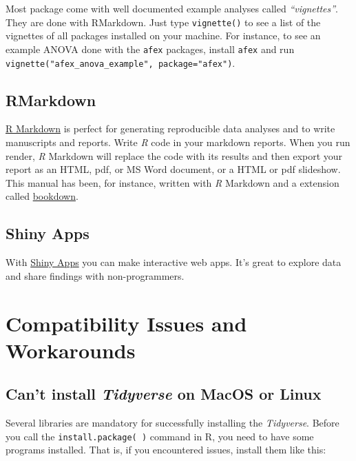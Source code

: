 \documentclass[
]{scrartcl}
\begin{document}
Most package come with well documented example analyses called \emph{``vignettes''}. They are done with RMarkdown. Just type \texttt{vignette()} to see a list of the vignettes of all packages installed on your machine. For instance, to see an example ANOVA done with the \texttt{afex} packages, install \texttt{afex} and run \texttt{vignette("afex\_anova\_example",\ package="afex")}.

\hypertarget{rmarkdown}{%
\subsection*{RMarkdown}\label{rmarkdown}}

\href{https://rmarkdown.rstudio.com/}{R Markdown} is perfect for generating reproducible data analyses and to write manuscripts and reports. Write \emph{R} code in your markdown reports. When you run render, \emph{R} Markdown will replace the code with its results and then export your report as an HTML, pdf, or MS Word document, or a HTML or pdf slideshow. This manual has been, for instance, written with \emph{R} Markdown and a extension called \href{https://www.bookdown.org/}{bookdown}.

\hypertarget{shiny-apps}{%
\subsection*{Shiny Apps}\label{shiny-apps}}

With \href{https://shiny.rstudio.com/}{Shiny Apps} you can make interactive web apps. It's great to explore data and share findings with non-programmers.

\hypertarget{compatibility-issues-and-workarounds}{%
\section{Compatibility Issues and Workarounds}\label{compatibility-issues-and-workarounds}}

\hypertarget{tidyverseinstall}{%
\subsection{\texorpdfstring{Can't install \emph{Tidyverse} on MacOS or Linux}{Can't install Tidyverse on MacOS or Linux}}\label{tidyverseinstall}}

Several libraries are mandatory for successfully installing the \emph{Tidyverse}. Before you call the \texttt{install.package(\ )} command in R, you need to have some programs installed. That is, if you encountered issues, install them like this:
\end{document}
